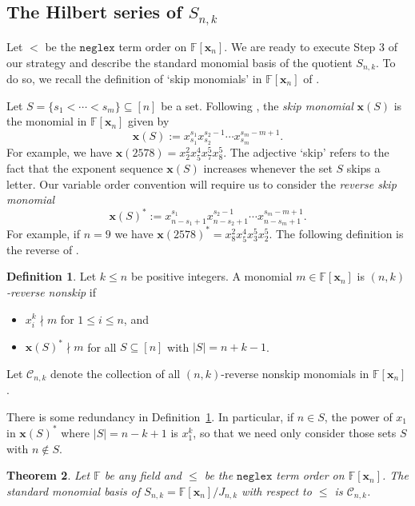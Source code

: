 \documentclass[10pt]{amsart}
\newtheorem{theorem}{Theorem}[section]
\theoremstyle{definition}
\newtheorem{defn}[theorem]{Definition}
\newcommand{\neglex}{{\mathtt {neglex}}}
\newcommand{\FF}{{\mathbb{F}}}
\newcommand{\CCC}{{\mathcal{C}}}
\newcommand{\xx}{{\mathbf {x}}}
\begin{document}
\subsection{The Hilbert series of $S_{n,k}$}
Let $<$ be the $\neglex$ term order on $\FF[\xx_n]$.
We are ready to execute Step 3 of our strategy and describe the standard monomial basis 
of the quotient $S_{n,k}$.  To do so, we recall the definition of `skip monomials' in $\FF[\xx_n]$ of \cite{HRS}.

Let $S = \{s_1 < \cdots < s_m \} \subseteq [n]$ be a set.  Following \cite[Defn. 3.2]{HRS},
the \emph{skip monomial} $\xx(S)$ is the monomial in $\FF[\xx_n]$ given by
\begin{equation}
\xx(S) := x_{s_1}^{s_1} x_{s_2}^{s_2 - 1} \cdots x_{s_m}^{s_m-m+1}.
\end{equation}
For example, we have $\xx(2578) = x_2^2 x_5^4 x_7^5 x_8^5$.  The adjective `skip' refers to the fact that 
the exponent sequence $\xx(S)$ increases whenever the set $S$ skips a letter.
Our variable order convention will require us to consider the \emph{reverse skip monomial}
\begin{equation}
\xx(S)^* := x_{n-s_1+1}^{s_1} x_{n-s_2+1}^{s_2-1} \cdots x_{n-s_m+1}^{s_m-m+1}.
\end{equation}
For example, if $n = 9$ we have $\xx(2578)^* = x_8^2 x_5^4 x_3^5 x_2^5$. 
The following definition is the reverse of \cite[Defn. 4.4]{HRS}.

\begin{defn}
\label{nonskip}
Let $k \leq n$ be positive integers.  A monomial $m \in \FF[\xx_n]$ is \emph{$(n,k)$-reverse nonskip} if
\begin{itemize}
\item $x_i^k \nmid m$ for $1 \leq i \leq n$, and
\item $\xx(S)^* \nmid m$ for all $S \subseteq [n]$ with $|S| = n+k-1$.
\end{itemize}
Let $\CCC_{n,k}$ denote the collection of all $(n,k)$-reverse nonskip monomials in $\FF[\xx_n]$.
\end{defn}

There is some redundancy in Definition~\ref{nonskip}.  In particular, if $n \in S$, the power of $x_1$
in $\xx(S)^*$  where $|S| = n-k+1$ is $x_1^k$, so that we need only consider those sets $S$ with $n \notin S$.


\begin{theorem}
\label{standard-monomial-basis}
Let $\FF$ be any field and $\leq$ be the $\neglex$ term order on $\FF[\xx_n]$. The standard monomial basis of $S_{n,k} = {\FF[\xx_n]} / {J_{n,k}}$ with respect to $\leq$ is $\CCC_{n,k}$.
\end{theorem}
\end{document}
